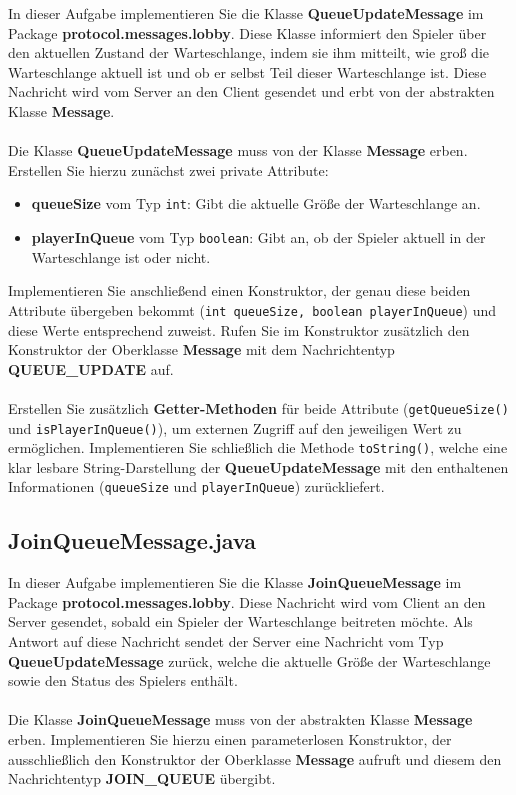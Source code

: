 \documentclass[12pt]{article}
\begin{document}
In dieser Aufgabe implementieren Sie die Klasse \textbf{QueueUpdateMessage} im Package \textbf{protocol.messages.lobby}. Diese Klasse informiert den Spieler über den aktuellen Zustand der Warteschlange, indem sie ihm mitteilt, wie groß die Warteschlange aktuell ist und ob er selbst Teil dieser Warteschlange ist. Diese Nachricht wird vom Server an den Client gesendet und erbt von der abstrakten Klasse \textbf{Message}.
\\ \\
Die Klasse \textbf{QueueUpdateMessage} muss von der Klasse \textbf{Message} erben. Erstellen Sie hierzu zunächst zwei private Attribute:
\begin{itemize}
    \item \textbf{queueSize} vom Typ \texttt{int}: Gibt die aktuelle Größe der Warteschlange an.
    \item \textbf{playerInQueue} vom Typ \texttt{boolean}: Gibt an, ob der Spieler aktuell in der Warteschlange ist oder nicht.
\end{itemize}

Implementieren Sie anschließend einen Konstruktor, der genau diese beiden Attribute übergeben bekommt (\texttt{int queueSize, boolean playerInQueue}) und diese Werte entsprechend zuweist. Rufen Sie im Konstruktor zusätzlich den Konstruktor der Oberklasse \textbf{Message} mit dem Nachrichtentyp \textbf{QUEUE\_UPDATE} auf.
\\ \\
Erstellen Sie zusätzlich \textbf{Getter-Methoden} für beide Attribute (\texttt{getQueueSize()} und \texttt{isPlayerInQueue()}), um externen Zugriff auf den jeweiligen Wert zu ermöglichen. Implementieren Sie schließlich die Methode \texttt{toString()}, welche eine klar lesbare String-Darstellung der \textbf{QueueUpdateMessage} mit den enthaltenen Informationen (\texttt{queueSize} und \texttt{playerInQueue}) zurückliefert.

\subsection*{JoinQueueMessage.java}

In dieser Aufgabe implementieren Sie die Klasse \textbf{JoinQueueMessage} im Package \textbf{protocol.messages.lobby}. Diese Nachricht wird vom Client an den Server gesendet, sobald ein Spieler der Warteschlange beitreten möchte. Als Antwort auf diese Nachricht sendet der Server eine Nachricht vom Typ \textbf{QueueUpdateMessage} zurück, welche die aktuelle Größe der Warteschlange sowie den Status des Spielers enthält.
\\ \\
Die Klasse \textbf{JoinQueueMessage} muss von der abstrakten Klasse \textbf{Message} erben. Implementieren Sie hierzu einen parameterlosen Konstruktor, der ausschließlich den Konstruktor der Oberklasse \textbf{Message} aufruft und diesem den Nachrichtentyp \textbf{JOIN\_QUEUE} übergibt.
\end{document}
